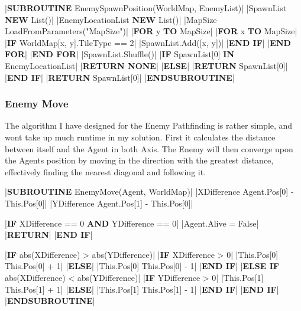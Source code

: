 \begin{flushleft}
                \vspace{0.2cm}
                \begin{pseudocode}
|\textbf{SUBROUTINE} EnemySpawnPosition(WorldMap, EnemyList)|
    |SpawnList \leftarrow \textbf{NEW} List()|
    |EnemyLocationList \leftarrow \textbf{NEW} List()|
    |MapSize \leftarrow LoadFromParameters("MapSize")|
    |\textbf{FOR} y  \textbf{TO} MapSize|
        |\textbf{FOR} x  \textbf{TO} MapSize|
            |\textbf{IF} WorldMap[x, y].TileType == 2|
                |SpawnList.Add([x, y])|
            |\textbf{END IF}|
        |\textbf{END FOR}|
    |\textbf{END FOR}|
    |SpawnList.Shuffle()|
    |\textbf{IF} SpawnList[0] \textbf{IN} EnemyLocationList|
        |\textbf{RETURN NONE}|
    |\textbf{ELSE}|
        |\textbf{RETURN} SpawnList[0]|
    |\textbf{END IF}|
    |\textbf{RETURN} SpawnList[0]|
|\textbf{ENDSUBROUTINE}|
                \end{pseudocode}

                \vspace{0.5cm}
            \subsubsection{Enemy Move}
                The algorithm I have designed for the Enemy Pathfinding is rather simple, and wont take up much runtime in my solution.
                First it calculates the distance between itself and the Agent in both Axis. The Enemy will then converge upon the Agents
                position by moving in the direction with the greatest distance, effectively finding the nearest diagonal and following it.

                \vspace{0.2cm}
                \begin{pseudocode}
|\textbf{SUBROUTINE} EnemyMove(Agent, WorldMap)|
    |XDifference \leftarrow Agent.Pos[0] - This.Pos[0]|
    |YDifference \leftarrow Agent.Pos[1] - This.Pos[0]|

    |\textbf{IF} XDifference == 0 \textbf{AND} YDifference == 0|
        |Agent.Alive = False|
        |\textbf{RETURN}|
    |\textbf{END IF}|

    |\textbf{IF} abs(XDifference) > abs(YDifference)|
        |\textbf{IF} XDifference > 0|
            |This.Pos[0] \leftarrow This.Pos[0] + 1|
        |\textbf{ELSE}|
            |This.Pos[0] \leftarrow This.Pos[0] - 1|
        |\textbf{END IF}|
    |\textbf{ELSE IF} abs(XDifference) < abs(YDifference)|
        |\textbf{IF} YDifference > 0|
            |This.Pos[1] \leftarrow This.Pos[1] + 1|
        |\textbf{ELSE}|
            |This.Pos[1] \leftarrow This.Pos[1] - 1|
        |\textbf{END IF}|
    |\textbf{END IF}|
|\textbf{ENDSUBROUTINE}|
                \end{pseudocode}
                

\end{flushleft}
